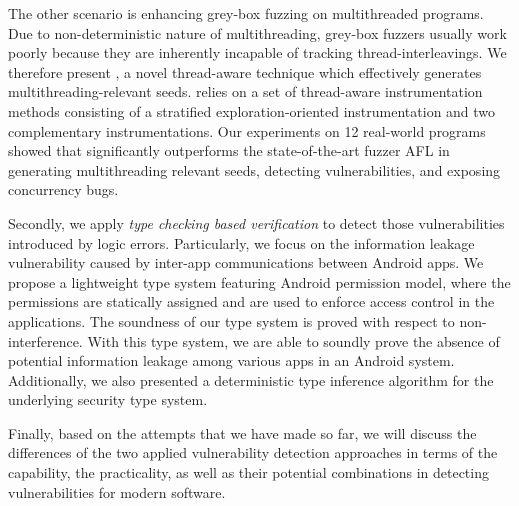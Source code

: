 The other scenario is enhancing grey-box fuzzing on multithreaded programs. Due to non-deterministic nature of multithreading, grey-box fuzzers usually work poorly because they are inherently incapable of tracking thread-interleavings.
We therefore present \mtfuzz, a novel thread-aware technique which effectively generates multithreading-relevant seeds. \mtfuzz relies on a set of thread-aware instrumentation methods consisting of a stratified exploration-oriented instrumentation and two complementary instrumentations. Our experiments on 12 real-world programs showed that \mtfuzz significantly outperforms the state-of-the-art fuzzer AFL in generating multithreading relevant seeds, detecting vulnerabilities, and exposing concurrency bugs.

Secondly, we apply \emph{type checking based verification} to detect those vulnerabilities introduced by logic errors. Particularly, we focus on the information leakage vulnerability caused by inter-app communications between Android apps. 
We propose a lightweight type system featuring Android permission model, where the permissions are statically assigned and are used to enforce access control in the applications. 
The soundness of our type system is proved with respect to non-interference. With this type system, we are able to soundly prove the absence of potential information leakage among various apps in an Android system.
 Additionally, we also presented a deterministic type inference algorithm for the underlying security type system. 

Finally, based on the attempts that we have made so far, we will discuss the differences of the two applied vulnerability detection approaches in terms of the capability, the practicality, as well as their potential combinations in detecting vulnerabilities for modern software.







